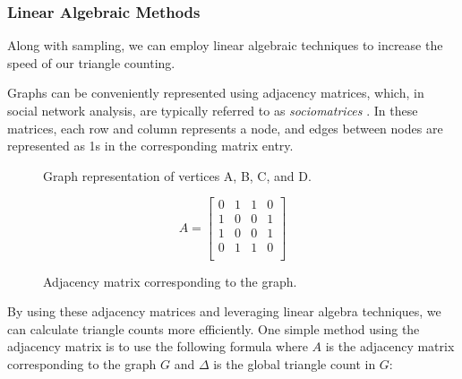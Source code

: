\documentclass[11pt]{article}
\begin{document}
\subsubsection{Linear Algebraic Methods}

Along with sampling, we can employ linear algebraic techniques to increase the speed of our triangle counting.

Graphs can be conveniently represented using adjacency matrices, which, in social network analysis, are typically referred to as \emph{sociomatrices} \cite{beum_method_1950}. 
In these matrices, each row and column represents a node, and edges between nodes are represented as 1s in the corresponding matrix entry.

\begin{figure}[H]
    \centering
    \begin{minipage}{0.45\textwidth}
        \caption{Graph representation of vertices A, B, C, and D.}
    \end{minipage}%
    \hfill
    \begin{minipage}{0.45\textwidth}
        \[
        A =
        \begin{bmatrix}
        0 & 1 & 1 & 0 \\
        1 & 0 & 0 & 1 \\
        1 & 0 & 0 & 1 \\
        0 & 1 & 1 & 0 \\
        \end{bmatrix}
        \]
        \caption{Adjacency matrix corresponding to the graph.}
    \end{minipage}
\end{figure}

By using these adjacency matrices and leveraging linear algebra techniques, we can calculate triangle counts more efficiently. 
One simple method using the adjacency matrix is to use the following formula where $A$ is the adjacency matrix corresponding to the graph $G$ and $\Delta$ is the global triangle count in $G$:
\end{document}
